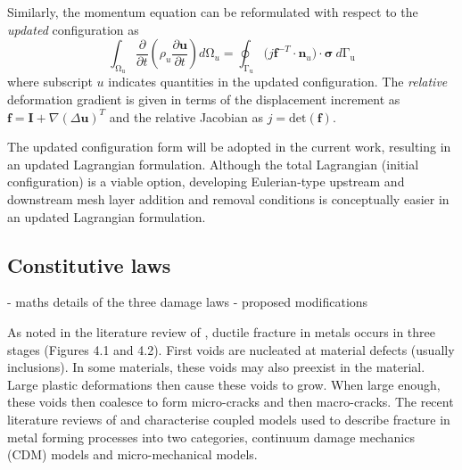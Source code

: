 \documentclass[sn-mathphys,Numbered,draft]{sn-jnl}%
\begin{document}
Similarly, the momentum equation can be reformulated with respect to the \emph{updated} configuration as
\begin{equation}
\label{eqn:updatedLagFormulation}
    \int_{\mathrm{\Omega_u}} \frac{\partial }{\partial t} \left( \rho_u \frac{\partial \mathbf{u} }{\partial t} \right) d\mathrm{\Omega}_u
    = \oint_{\mathrm{\Gamma_u}}(j\mathbf{f}^{-T}\cdot{\mathbf{n}_u)\cdot\boldsymbol{\sigma}}\ d\mathrm{\Gamma_u}
\end{equation}
where subscript $u$ indicates quantities in the updated configuration.
The \emph{relative} deformation gradient is given in terms of the displacement increment as $\mathbf{f}=\mathbf{I}+\nabla(\Delta \mathbf{u})^T$ and the relative Jacobian as $j = \text{det}(\mathbf{f})$.

The updated configuration form will be adopted in the current work, resulting in an updated Lagrangian formulation. Although the total Lagrangian (initial configuration) is a viable option, developing Eulerian-type upstream and downstream mesh layer addition and removal conditions is conceptually easier in an updated Lagrangian formulation.





\subsection{Constitutive laws}

- maths details of the three damage laws
- proposed modifications


As noted in the literature review of \citet{garrison_ductile_1987}, ductile fracture in metals occurs in three stages (Figures 4.1 and 4.2). First voids are nucleated at material defects (usually inclusions). In some materials, these voids may also preexist in the material. Large plastic deformations then cause these voids to grow. When large enough, these voids then coalesce to form micro-cracks and then macro-cracks. The recent literature reviews of \citet{cao_models_2017} and \citet{tekkaya_damage_2020} characterise coupled models used to describe fracture in metal forming processes into two categories, continuum damage mechanics (CDM) models and micro-mechanical models. 
\end{document}
